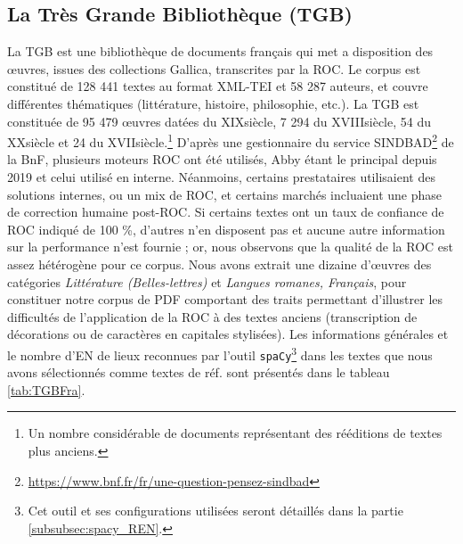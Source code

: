 \subsection{La Très Grande Bibliothèque (TGB)}
La TGB est une bibliothèque de documents français qui met a disposition des œuvres, issues des collections Gallica, transcrites par la ROC. Le corpus est constitué de 128 441 textes au format XML-TEI et 58 287 auteurs, et couvre différentes thématiques (littérature, histoire, philosophie, etc.). La TGB est constituée de 95 479 œuvres datées du \textsc{XIX}\ieme{}siècle, 7 294 du \textsc{XVIII}\ieme{}siècle, 54 du \textsc{XX}\ieme{}siècle et 24 du \textsc{XVII}\ieme{}siècle.\footnote{Un nombre considérable de documents représentant des rééditions de textes plus anciens.} 
D'après une gestionnaire du service SINDBAD\footnote{\url{https://www.bnf.fr/fr/une-question-pensez-sindbad}} de la BnF, plusieurs moteurs ROC ont été utilisés, Abby étant le principal depuis 2019 et celui utilisé en interne. Néanmoins, certains prestataires utilisaient des solutions internes, ou un mix de ROC, et certains marchés incluaient une phase de correction humaine post-ROC. Si certains textes ont un taux de confiance de ROC indiqué de 100 \%, d'autres n'en disposent pas et aucune autre information sur la performance n'est fournie ; or, nous observons que la qualité de la ROC est assez hétérogène pour ce corpus. Nous avons extrait une dizaine d'œuvres des catégories \textit{Littérature (Belles-lettres)} et \textit{Langues romanes, Français}, pour constituer notre corpus de PDF comportant des traits permettant d'illustrer les difficultés de l'application de la ROC à des textes anciens (transcription de décorations ou de caractères en capitales stylisées). Les informations générales et le nombre d'EN de lieux reconnues par l'outil \texttt{spaCy}\footnote{Cet outil et ses configurations utilisées seront détaillés dans la partie \ref{subsubsec:spacy_REN}.} dans les textes que nous avons sélectionnés comme textes de réf. sont présentés dans le tableau \ref{tab:TGBFra}.
